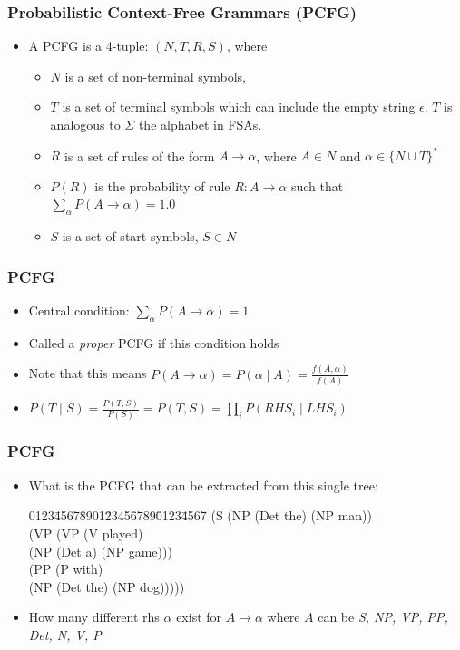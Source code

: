 \begin{frame}
\frametitle{Probabilistic Context-Free Grammars (PCFG)}
\begin{itemize}
\item A PCFG is a 4-tuple: $(N, T, R, S)$, where 
\begin{itemize}
\item $N$ is a set of non-terminal symbols, 
\item $T$ is a set of terminal symbols which can include the empty
  string $\epsilon$. $T$ is analogous to $\Sigma$ the alphabet in FSAs.
\item $R$ is a set of rules of the form $A \rightarrow \alpha$, where $A \in N$ and $\alpha \in \{ N \cup T \}^\ast$
\item $P(R)$ is the probability of rule $R: A \rightarrow \alpha$ such that $\sum_\alpha P(A \rightarrow \alpha) = 1.0$
\item $S$ is a set of start symbols, $S \in N$
\end{itemize}
\end{itemize}

\end{frame}

\begin{frame}
\frametitle{PCFG}
\begin{itemize}
\item Central condition: \( \sum_\alpha P( A \rightarrow \alpha) = 1 \)
\item Called a {\em proper} PCFG if this condition holds
\item Note that this means $P( A \rightarrow \alpha) = P( \alpha \mid A) = \frac{f(A, \alpha)}{f(A)}$
\item \( P(T \mid S) = \frac{P(T,S)}{P(S)} = P(T,S) = \prod_i P(RHS_i \mid LHS_i) \)
\end{itemize}

\end{frame}



\begin{frame}
\frametitle{PCFG}
\begin{itemize}
\item What is the PCFG that can be extracted from this single tree: 
\begin{tabbing}
0123\=4567\=8901\=2345\=6789\=0123\=4567 \kill
(S \>(NP (Det the) (NP man)) \\
\> (VP \> (VP \> (V played) \\
\> \> \> (NP (Det a) (NP game))) \\
\> \> (PP \>(P with) \\
\> \> \> (NP (Det the) (NP dog)))))
\end{tabbing}
\item How many different rhs $\alpha$ exist for $A \rightarrow \alpha$ where $A$ can be {\it S, NP, VP, PP, Det, N, V, P}
\end{itemize}

\end{frame}


